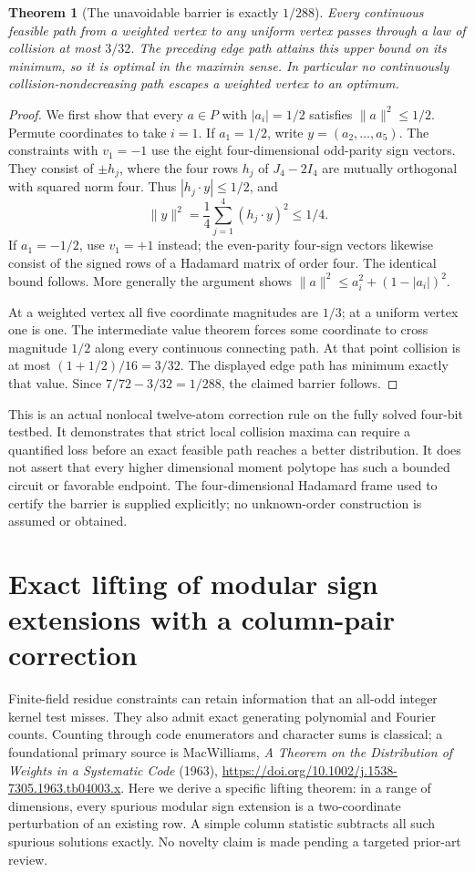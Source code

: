 \documentclass[11pt]{article}
\newtheorem{theorem}{Theorem}[section]
\begin{document}
\begin{theorem}[The unavoidable barrier is exactly $1/288$]
Every continuous feasible path from a weighted vertex to any uniform
vertex passes through a law of collision at most $3/32$.
The preceding edge path attains this upper bound on its minimum, so
it is optimal in the maximin sense. In particular no continuously
collision-nondecreasing path escapes a weighted vertex to an optimum.
\end{theorem}
\begin{proof}
We first show that every $a\in P$ with $|a_i|=1/2$ satisfies
$\|a\|^2\le1/2$. Permute coordinates to take $i=1$.
If $a_1=1/2$, write $y=(a_2,\ldots,a_5)$. The constraints with
$v_1=-1$ use the eight four-dimensional odd-parity sign vectors.
They consist of $\pm h_j$, where the four rows $h_j$ of $J_4-2I_4$
are mutually orthogonal with squared norm four. Thus
$|h_j\cdot y|\le1/2$, and
\[
 \|y\|^2=\frac14\sum_{j=1}^4(h_j\cdot y)^2\le1/4.
\]
If $a_1=-1/2$, use $v_1=+1$ instead; the even-parity four-sign
vectors likewise consist of the signed rows of a Hadamard matrix
of order four. The identical bound follows. More generally the
argument shows $\|a\|^2\le a_i^2+(1-|a_i|)^2$.

At a weighted vertex all five coordinate magnitudes are $1/3$;
at a uniform vertex one is one. The intermediate value theorem
forces some coordinate to cross magnitude $1/2$ along every
continuous connecting path. At that point collision is at most
$(1+1/2)/16=3/32$. The displayed edge path has minimum exactly that
value. Since $7/72-3/32=1/288$, the claimed barrier follows.
\end{proof}

This is an actual nonlocal twelve-atom correction rule on the fully
solved four-bit testbed. It demonstrates that strict local collision
maxima can require a quantified loss before an exact feasible path
reaches a better distribution. It does not assert that every higher
dimensional moment polytope has such a bounded circuit or favorable
endpoint. The four-dimensional Hadamard frame used to certify the
barrier is supplied explicitly; no unknown-order construction is
assumed or obtained.
\section{Exact lifting of modular sign extensions with a column-pair correction}
\label{sec:modular-sign-lifting}

Finite-field residue constraints can retain information that an
all-odd integer kernel test misses. They also admit exact generating
polynomial and Fourier counts. Counting through code enumerators and
character sums is classical; a foundational primary source is
MacWilliams, \emph{A Theorem on the Distribution of Weights in a
Systematic Code} (1963),
\url{https://doi.org/10.1002/j.1538-7305.1963.tb04003.x}.
Here we derive a specific lifting theorem: in a range of dimensions,
every spurious modular sign extension is a two-coordinate perturbation
of an existing row. A simple column statistic subtracts all such
spurious solutions exactly. No novelty claim is made pending a
targeted prior-art review.
\end{document}

